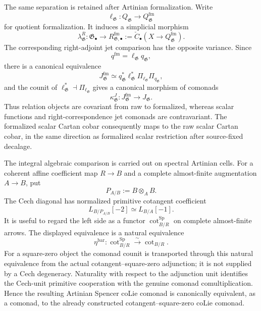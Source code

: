 The same separation is retained after Artinian formalization.  Write
\[
    \ell_{\mathfrak G}:
    Q_{\mathfrak G}\longrightarrow Q^{\mathrm{fm}}_{\mathfrak G}
\]
for quotient formalization.  It induces a simplicial morphism
\[
    \lambda^R_{\mathfrak G}:
    \mathfrak G_\bullet
    \longrightarrow
    R^{\mathrm{fm}}_{\mathfrak G,\bullet}
    :=
    \check C_\bullet
    \left(
        X\to Q^{\mathrm{fm}}_{\mathfrak G}
    \right).
\]
The corresponding right-adjoint jet comparison has the opposite variance.
Since
\[
    q^{\mathrm{fm}}=\ell_{\mathfrak G}q_{\mathfrak G},
\]
there is a canonical equivalence
\[
    J^{\mathrm{fm}}_{\mathfrak G}
    \simeq
    q_{\mathfrak G}^*\ell_{\mathfrak G}^*
    \Pi_{\ell_{\mathfrak G}}\Pi_{q_{\mathfrak G}},
\]
and the counit of
$\ell_{\mathfrak G}^*\dashv\Pi_{\ell_{\mathfrak G}}$ gives a canonical
morphism of comonads
\[
\boxed{
    \kappa^J_{\mathfrak G}:
    J^{\mathrm{fm}}_{\mathfrak G}
    \longrightarrow
    J_{\mathfrak G}.
}
\]
Thus relation objects are covariant from raw to formalized, whereas scalar
functions and right-correspondence jet comonads are contravariant.  The
formalized scalar Cartan cobar consequently maps to the raw scalar Cartan
cobar, in the same direction as formalized scalar restriction after
source-fixed decalage.

The integral algebraic comparison is carried out on spectral Artinian cells.
For a coherent affine coefficient map $R\to B$ and a complete almost-finite
augmentation $A\to B$, put
\[
    P_{A/B}:=B\otimes_A B.
\]
The Cech diagonal has normalized primitive cotangent coefficient
\[
    L_{B/P_{A/B}}[-2]
    \simeq
    L_{B/A}[-1].
\]
It is useful to regard the left side as a functor
$\operatorname{cot}^{\mathrm{Sp}}_{B/R}$ on complete almost-finite arrows.
The displayed equivalence is a natural equivalence
\[
    \eta^{\mathrm{bar}}:
    \operatorname{cot}^{\mathrm{Sp}}_{B/R}
    \xrightarrow{\sim}
    \operatorname{cot}_{B/R}.
\]
For a square-zero object the comonad counit is transported through this
natural equivalence from the actual cotangent--square-zero adjunction; it is
not supplied by a Cech degeneracy.  Naturality with respect to the adjunction
unit identifies the Cech-unit primitive cooperation with the genuine comonad
comultiplication.  Hence the resulting Artinian Spencer coLie comonad is
canonically equivalent, as a comonad, to the already constructed
cotangent--square-zero coLie comonad.


